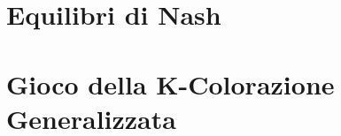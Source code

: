 \documentclass[11pt,a4paper,oneside,openany]{book}
\begin{document}
    
    \tableofcontents
    
    \part{Equilibri di Nash}    
    
    
    \part{Gioco della K-Colorazione Generalizzata}
    

	
\end{document}

